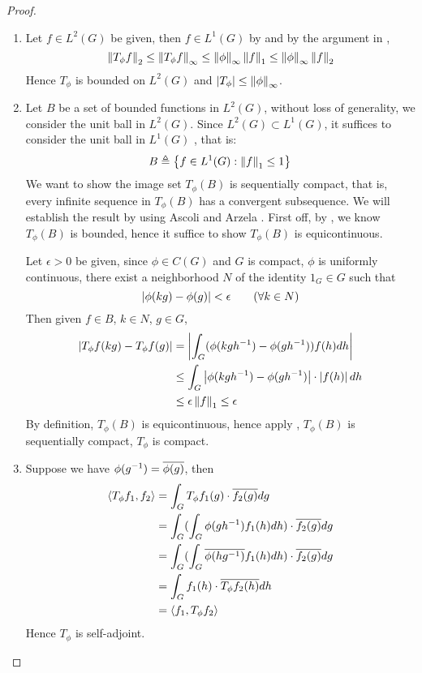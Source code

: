 \begin{proof}
  \begin{enumerate}
    \item Let $f \in L^2(G)$ be given, then $f \in L^1(G)$ by 
      and by the argument in ,
      \[
        \left\lVert T_{\phi} f\right\rVert_{2} \leq
        \left\lVert T_{\phi} f\right\rVert_{\infty} \leq
        \left\lVert\phi\right\rVert_{\infty} \left\lVert f\right\rVert_1 \leq \left\lVert\phi\right\rVert_{\infty} \left\lVert f\right\rVert_2
      \]
      Hence $T_{\phi}$ is bounded on $L^2(G)$ and $\left|T_{\phi}\right| \leq \left\lVert\phi\right\rVert_{\infty}$.

    \item 
      Let $B$ be a set of bounded functions in $L^2(G)$, without loss of
      generality, we consider the unit ball in $L^2(G)$. Since $L^2(G) \subset
      L^1(G)$, it suffices to consider the unit ball in $L^1(G)$ , that is:
      \[
        B \triangleq \left\{ f \in L^1(G) : \left\lVert f\right\rVert_1 \leq 1 \right\}
      \]
      We want to show the image set $T_{\phi}(B)$ is sequentially compact, that
      is, every infinite sequence in $T_{\phi}(B)$ has a convergent subsequence.
      We will establish the result by using Ascoli and Arzela
      .  First off, by , we know
      $T_{\phi}(B)$ is bounded, hence it suffice to show $T_{\phi}(B)$ is
      equicontinuous.

      Let $\epsilon > 0$ be given, since $\phi \in C(G)$ and $G$ is compact,
      $\phi$ is uniformly continuous, there exist a neighborhood $N$ of the
      identity $1_G \in G$ such that
      \[
        \left|\phi(kg) - \phi(g)\right| < \epsilon \qquad (\forall k \in N)
      \]
      Then given $f \in B$, $k \in N$, $g \in G$,
      \begin{align*}
        \left|T_{\phi}f(kg) - T_{\phi}f(g)\right|
        & = \left|\int_G (\phi(kgh^{-1}) - \phi(gh^{-1})) f(h) dh\right|\\
        & \leq \int_G \left|\phi(kgh^{-1}) - \phi(gh^{-1})\right| \cdot \left|f(h)\right| dh\\
        & \leq \epsilon \left\lVert f\right\rVert_1 \leq \epsilon
      \end{align*}
      By definition, $T_{\phi}(B)$ is equicontinuous, hence apply
      , $T_{\phi}(B)$ is sequentially compact, $T_{\phi}$ is
      compact.

    \item Suppose we have $\phi(g^{-1}) = \overline{\phi(g)}$, then
      \begin{align*}
        \langle T_{\phi}f_1, f_2 \rangle
        & = \int_G T_{\phi}f_1(g) \cdot \overline{f_2(g)} dg\\
        & = \int_G (\int_G \phi(gh^{-1}) f_1(h) dh) \cdot \overline{f_2(g)} dg\\
        & = \int_G (\int_G \overline{\phi(hg^{-1})} f_1(h) dh) \cdot \overline{f_2(g)} dg\\
        & = \int_G f_1(h) \cdot \overline{T_{\phi}f_2(h)} dh\\
        & = \langle f_1, T_{\phi}f_2 \rangle
      \end{align*}
      Hence $T_{\phi}$ is self-adjoint.
  \end{enumerate}
\end{proof}

